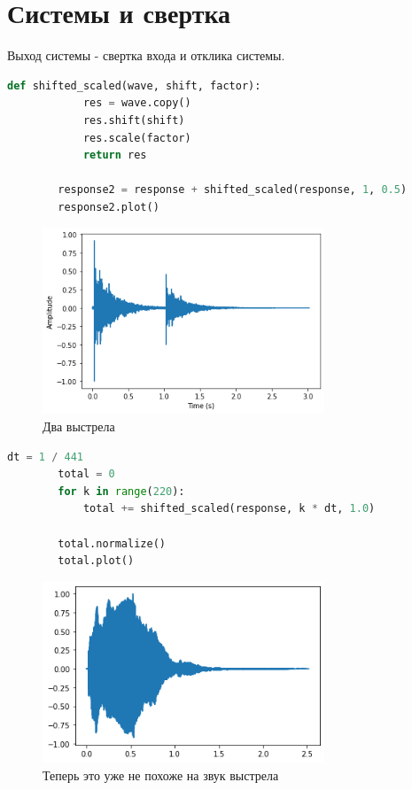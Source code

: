 \documentclass[a4paper, 12pt]{report}
\begin{document}
	\chapter{Системы и свертка}
	Выход системы - свертка входа и отклика системы.
	\begin{lstlisting}[language=Python,caption=Создадим звук двух последовательных выстрелов]
		def shifted_scaled(wave, shift, factor):
			res = wave.copy()
			res.shift(shift)
			res.scale(factor)
			return res

		response2 = response + shifted_scaled(response, 1, 0.5)
		response2.plot()
	\end{lstlisting}
	\begin{figure}[H]
		\centering
		\includegraphics[width=0.75\textwidth]{shot9.png}
		\caption{Два выстрела}
		\label{fig:shot9}
	\end{figure}
	\begin{lstlisting}[language=Python,caption=Очень много последовательных выстрелов]
		dt = 1 / 441
		total = 0
		for k in range(220):
			total += shifted_scaled(response, k * dt, 1.0)
		
		total.normalize()
		total.plot()
	\end{lstlisting}
	\begin{figure}[H]
		\centering
		\includegraphics[width=0.75\textwidth]{shot10.png}
		\caption{Теперь это уже не похоже на звук выстрела}
		\label{fig:shot10}
	\end{figure}
\end{document}
